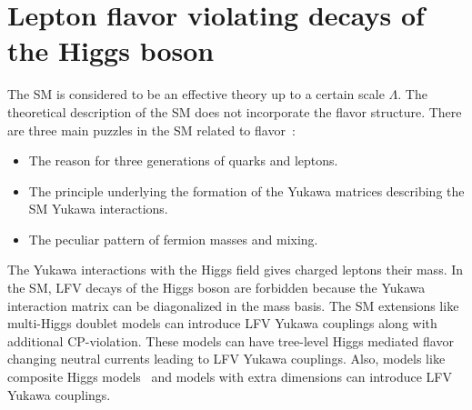 \section{Lepton flavor violating decays of the Higgs boson}
The SM is considered to be an effective theory up to a certain scale $\Lambda$. The theoretical description of the SM does not incorporate the flavor structure. There are three main puzzles in the SM related to flavor~\cite{Raidal:2008jk}:
\begin{itemize}
  \item The reason for three generations of quarks and leptons.
  \item The principle underlying the formation of the Yukawa matrices describing the SM Yukawa interactions.
  \item The peculiar pattern of fermion masses and mixing.
\end{itemize}

The Yukawa interactions with the Higgs field gives charged leptons their mass. In the SM, LFV decays of the Higgs boson are forbidden because the Yukawa interaction matrix can be diagonalized in the mass basis. The SM extensions like multi-Higgs doublet models can introduce LFV Yukawa couplings along with additional CP-violation. These models can have tree-level Higgs mediated flavor changing neutral currents leading to LFV Yukawa couplings. Also, models like composite Higgs models~\cite{Blankenburg:2012ex} and models with extra dimensions can introduce LFV Yukawa couplings.

